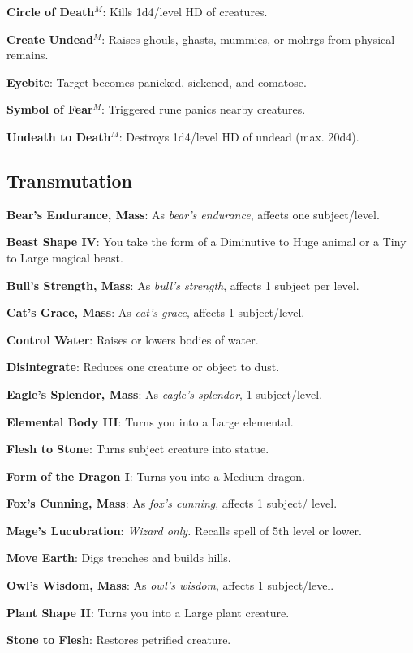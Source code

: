 \textbf{Circle of Death}\(^{M}\): Kills 1d4/level HD of creatures.

\textbf{Create Undead}\(^{M}\): Raises ghouls, ghasts, mummies, or mohrgs from physical remains.

\textbf{Eyebite}: Target becomes panicked, sickened, and comatose.

\textbf{Symbol of Fear}\(^{M}\): Triggered rune panics nearby creatures.

\textbf{Undeath to Death}\(^{M}\): Destroys 1d4/level HD of undead (max. 20d4).

\subsection{Transmutation}


\textbf{Bear's Endurance, Mass}: As \textit{bear's endurance}, affects one subject/level.

\textbf{Beast Shape IV}: You take the form of a Diminutive to Huge animal or a Tiny to Large magical beast.

\textbf{Bull's Strength, Mass}: As \textit{bull's strength}, affects 1 subject per level.

\textbf{Cat's Grace, Mass}: As \textit{cat's grace}, affects 1 subject/level.

\textbf{Control Water}: Raises or lowers bodies of water.

\textbf{Disintegrate}: Reduces one creature or object to dust.

\textbf{Eagle's Splendor, Mass}: As \textit{eagle's splendor}, 1 subject/level.

\textbf{Elemental Body III}: Turns you into a Large elemental.

\textbf{Flesh to Stone}: Turns subject creature into statue.

\textbf{Form of the Dragon I}: Turns you into a Medium dragon.

\textbf{Fox's Cunning, Mass}: As \textit{fox's cunning}, affects 1 subject/ level.

\textbf{Mage's Lucubration}: \textit{Wizard only. }Recalls spell of 5th level or lower.

\textbf{Move Earth}: Digs trenches and builds hills.

\textbf{Owl's Wisdom, Mass}: As \textit{owl's wisdom}, affects 1 subject/level.

\textbf{Plant Shape II}: Turns you into a Large plant creature.

\textbf{Stone to Flesh}: Restores petrified creature.

